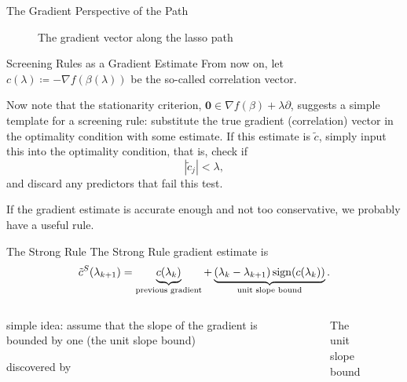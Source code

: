 \documentclass[10pt,ignorenonframetext]{beamer}
\begin{document}
\begin{frame}{The Gradient Perspective of the Path}
  \begin{figure}
    
    \caption{The gradient vector along the lasso path}
  \end{figure}
\end{frame}

\begin{frame}{Screening Rules as a Gradient Estimate}
  From now on, let \(c(\lambda) \coloneqq -\nabla f(\beta(\lambda))\)
  be the so-called \alert{correlation} vector.

  \medskip

  Now note that the stationarity criterion, \(\boldsymbol{0} \in \nabla f(\beta)
  + \lambda \partial\), suggests a simple template for a screening rule:
  substitute the true gradient (correlation) vector in the optimality condition
  with some estimate. If this estimate is \(\tilde c\), simply input this into
  the optimality condition, that is, check if
  \[
    |\tilde c_j| < \lambda,
  \]
  and discard any predictors that fail this test. \medskip

  If the gradient estimate is accurate enough and not too conservative, we
  probably have a useful rule.
\end{frame}

\begin{frame}{The Strong Rule}
  The Strong Rule gradient estimate is
  \[
    \tilde c^S(\lambda_{k+1}) =
    \underbrace{c(\lambda_k)}_\text{previous gradient} +
    \underbrace{(\lambda_k - \lambda_{k+1})\operatorname{sign}(c(\lambda_k))}_\text{unit
      slope
      bound}.
  \]
  \begin{columns}
    \begin{column}{0.45\linewidth}
      simple idea: assume that the slope of the gradient is bounded by one (the
      unit slope bound) \medskip

      discovered by \parencite{tibshirani2012}
    \end{column}
    \begin{column}{0.45\linewidth}
      \begin{figure}
        \centering
        
        \caption{The unit slope bound}
      \end{figure}
    \end{column}
  \end{columns}
\end{frame}
\end{document}
